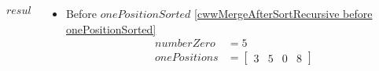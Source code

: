 \begin{frame}[containsverbatim]{\cwwalgortihmexampleframe}
\begin{columns}[c]
\begin{column}{0.45\textwidth}
{\begin{minipage}[c]{\textwidth}
\begin{algorithm}[H]
\begin{algorithmic}[1]
                                            \State \Return $result$
                                        \EndFunction
                                    \end{algorithmic}
                                \end{algorithm}
                            \endgroup
                        \end{minipage}
                    }
                \end{column}

                \begin{column}{0.55\textwidth}
                    \begin{itemize}
                        \item Before $onePositionSorted$ \cref{cwwMergeAfterSortRecursive before onePositionSorted}
                        \begin{align*}
                            numberZero & = 5 \\
                            onePositions & = \begin{bmatrix}3 & 5 & 0 & 8\end{bmatrix}
                        \end{align*}
                    \end{itemize}
                \end{column}
            \end{columns}
        \end{frame}

